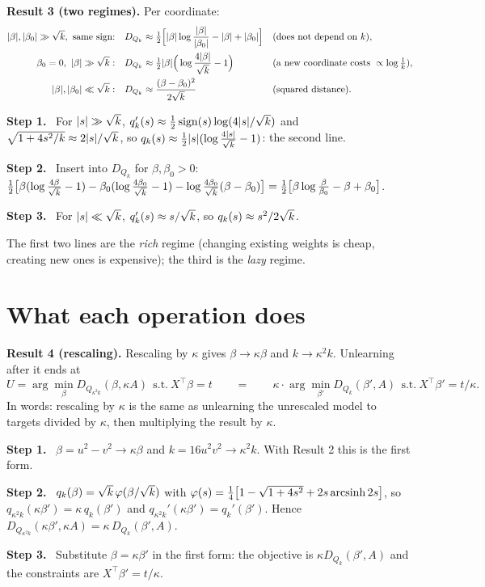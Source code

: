 \documentclass[10pt]{article}
\newcommand{\step}[1]{\par\smallskip\textbf{Step #1.}\ }
\begin{document}
\textbf{Result 3 (two regimes).} Per coordinate:
\begin{align*}
|\beta|,|\beta_0|\gg\sqrt k,\ \text{same sign:}&\quad D_{Q_k}\approx\tfrac12\Big[|\beta|\log\frac{|\beta|}{|\beta_0|}-|\beta|+|\beta_0|\Big] &&\text{(does not depend on $k$)},\\
\beta_0=0,\ |\beta|\gg\sqrt k:&\quad D_{Q_k}\approx\tfrac12|\beta|\Big(\log\frac{4|\beta|}{\sqrt k}-1\Big) &&\text{(a new coordinate costs }\propto\log\tfrac1k),\\
|\beta|,|\beta_0|\ll\sqrt k:&\quad D_{Q_k}\approx\frac{(\beta-\beta_0)^2}{2\sqrt k} &&\text{(squared distance)}.
\end{align*}
\step1 For $|s|\gg\sqrt k$, $q_k'(s)\approx\frac12\operatorname{sign}(s)\log(4|s|/\sqrt k)$ and $\sqrt{1+4s^2/k}\approx2|s|/\sqrt k$, so $q_k(s)\approx\frac12|s|(\log\frac{4|s|}{\sqrt k}-1)$: the second line.
\step2 Insert into $D_{Q_k}$ for $\beta,\beta_0>0$: $\frac12\big[\beta(\log\frac{4\beta}{\sqrt k}-1)-\beta_0(\log\frac{4\beta_0}{\sqrt k}-1)-\log\frac{4\beta_0}{\sqrt k}(\beta-\beta_0)\big]=\frac12\big[\beta\log\frac\beta{\beta_0}-\beta+\beta_0\big]$.
\step3 For $|s|\ll\sqrt k$, $q_k'(s)\approx s/\sqrt k$, so $q_k(s)\approx s^2/2\sqrt k$.

The first two lines are the \emph{rich} regime (changing existing weights is cheap, creating new ones is expensive); the third is the \emph{lazy} regime.

\section{What each operation does}
\textbf{Result 4 (rescaling).} Rescaling by $\kappa$ gives $\beta\to\kappa\beta$ and $k\to\kappa^2k$. Unlearning after it ends at
\begin{equation}\label{resc}
U=\arg\min_\beta D_{Q_{\kappa^2k}}(\beta,\kappa A)\ \ \text{s.t.}\ X^\top\beta=t\qquad=\qquad\kappa\cdot\arg\min_{\beta'}D_{Q_k}(\beta',A)\ \ \text{s.t.}\ X^\top\beta'=t/\kappa .
\end{equation}
In words: rescaling by $\kappa$ is the same as unlearning the unrescaled model to targets divided by $\kappa$, then multiplying the result by $\kappa$.
\step1 $\beta=u^2-v^2\to\kappa\beta$ and $k=16u^2v^2\to\kappa^2k$. With Result 2 this is the first form.
\step2 $q_k(\beta)=\sqrt k\,\varphi(\beta/\sqrt k)$ with $\varphi(s)=\frac14\big[1-\sqrt{1+4s^2}+2s\operatorname{arcsinh}2s\big]$, so $q_{\kappa^2k}(\kappa\beta')=\kappa\,q_k(\beta')$ and $q_{\kappa^2k}'(\kappa\beta')=q_k'(\beta')$. Hence $D_{Q_{\kappa^2k}}(\kappa\beta',\kappa A)=\kappa\,D_{Q_k}(\beta',A)$.
\step3 Substitute $\beta=\kappa\beta'$ in the first form: the objective is $\kappa D_{Q_k}(\beta',A)$ and the constraints are $X^\top\beta'=t/\kappa$.
\end{document}
